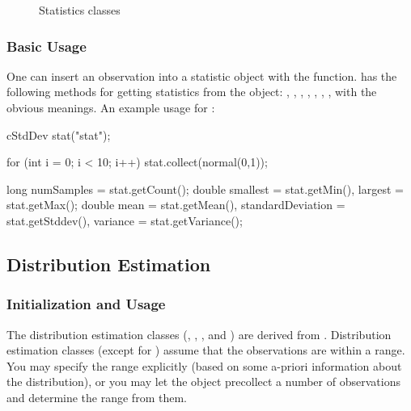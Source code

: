 \begin{figure}[htbp]
  \begin{center}
    
    \caption{Statistics classes}
  \end{center}
\end{figure}

\subsubsection{Basic Usage}
\label{sec:sim-lib:cstatistic-basic-usage}

One can insert an observation into a statistic object with the
 function.  has the following methods for
getting statistics from the object: , ,
, , , ,
,  with the obvious meanings. An example
usage for :

\begin{cpp}
cStdDev stat("stat");

for (int i = 0; i < 10; i++)
  stat.collect(normal(0,1));

long numSamples = stat.getCount();
double smallest = stat.getMin(),
       largest = stat.getMax();
double mean = stat.getMean(),
       standardDeviation = stat.getStddev(),
       variance = stat.getVariance();
\end{cpp}



\subsection{Distribution Estimation}
\label{sec:sim-lib:distribution-estimation-classes}

\subsubsection{Initialization and Usage}
\label{sec:sim-lib:histograms-initialization-and-usage}


The distribution estimation classes
(, , ,
 and ) are derived from
. Distribution estimation classes (except for
) assume that the observations are within a range.
You may specify the range explicitly (based on some a-priori information
about the distribution), or you may let the object precollect a number
of observations and determine the range from them.

